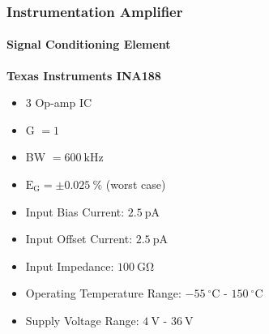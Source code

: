 \documentclass{beamer}
\begin{document}
\begin{frame}
\frametitle{Instrumentation Amplifier}
\framesubtitle{Signal Conditioning Element}

\textbf{Texas Instruments INA188}

\begin{itemize}
	\item 3 Op-amp IC
	\item G $ = 1 $
	\item BW $ = 600~\mathrm{kHz} $
	\item $ \mathrm{E_G} = \pm 0.025~\% $ (worst case)
	\item Input Bias Current: $2.5~\mathrm{pA}$
	\item Input Offset Current: $2.5~\mathrm{pA}$
	\item Input Impedance: $100~\mathrm{G\Omega}$
	\item Operating Temperature Range: $-55~^\circ \mathrm{C}$ - $150~^\circ \mathrm{C}$
	\item Supply Voltage Range: $4~\mathrm{V}$ - $36~\mathrm{V}$
\end{itemize}
\end{frame}
\end{document}
